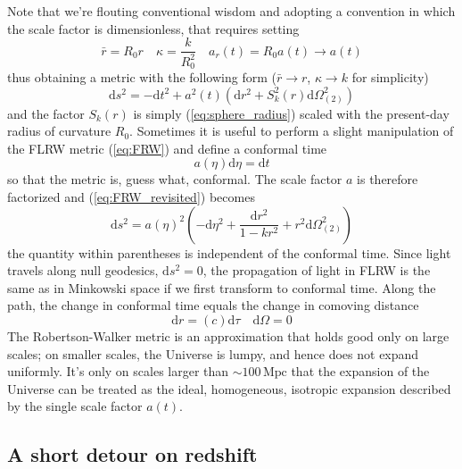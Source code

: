 \par Note that we're flouting conventional wisdom and adopting a convention in which the scale factor is dimensionless, that requires setting
\begin{equation}
    \bar{r} = R_{0}r \quad \kappa = \frac{k}{R_{0}^{2}} \quad a_{r}(t) = R_{0}a(t)\to a(t)
\end{equation}
thus obtaining a metric with the following form ($\bar{r}\to r$, $\kappa \to k$ for simplicity)
\begin{equation}
    \text{d}s^{2} = -\text{d}t^{2} + a^{2}(t)(\text{d}r^{2}+S_{k}^{2}(r)\text{d}\Omega_{(2)}^{2})
\end{equation}
and the factor $S_{k}(r)$ is simply (\ref{eq:sphere_radius}) scaled with the present-day radius of curvature $R_{0}$. Sometimes it is useful to perform a slight manipulation of the FLRW metric (\ref{eq:FRW}) and define a conformal time 
\begin{equation*}
    a(\eta)\text{d}\eta = \text{d}t
\end{equation*}
so that the metric is, guess what, conformal. The scale factor $a$ is therefore factorized and (\ref{eq:FRW_revisited}) becomes
\begin{equation}
    \text{d}s^{2} = a(\eta)^{2}\left(-\text{d}\eta^{2}+\frac{\text{d}r^{2}}{1-kr^{2}}+r^{2}\text{d}\Omega_{(2)}^{2}\right)
    \label{eq:FRW_conf}
\end{equation}
the quantity within parentheses is independent of the conformal time. Since light travels along null geodesics, $\text{d}s^{2} = 0$, the propagation of light in FLRW is the same as in Minkowski space if we first transform to conformal time. Along the path, the change in conformal time equals the change in comoving distance
\begin{equation*}
    \text{d}r = (c)\text{d}\tau \quad \text{d}\Omega = 0
\end{equation*}
The Robertson-Walker metric is an approximation that holds good only on large scales; on smaller scales, the Universe is lumpy, and hence does not expand uniformly.
It’s only on scales larger than $\sim 100\,\text{Mpc}$ that the expansion of the Universe can be treated as the ideal, homogeneous, isotropic expansion described by the single scale factor $a(t)$.

\subsection{A short detour on redshift}

